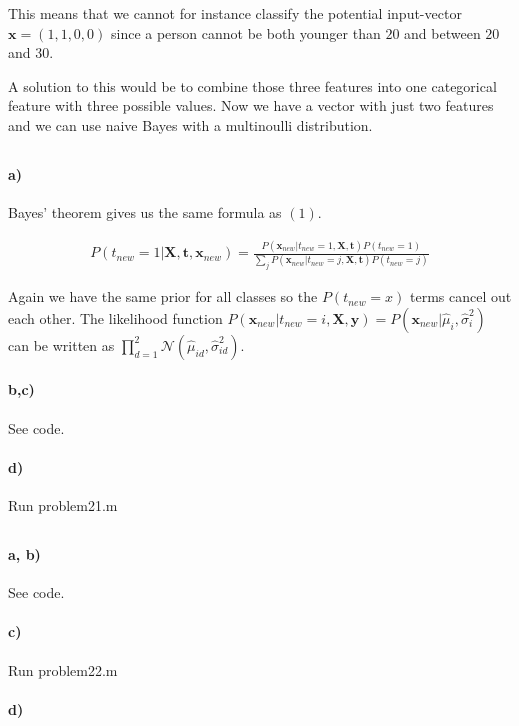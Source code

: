 \documentclass{article}
\begin{document}
This means that we cannot for instance classify the potential input-vector
$\mathbf{x} = (1, 1, 0, 0)$ since a person cannot be both younger than $20$ and
between $20$ and $30$.

A solution to this would be to combine those three features into one
categorical feature with three possible values. Now we have a vector with just
two features and we can use naive Bayes with a multinoulli distribution.

\setcounter{section}{2}
\setcounter{subsection}{0}
\subsection{}

\paragraph{a)}

Bayes' theorem gives us the same formula as $(1)$.

\begin{align}
  P\left( t_{new} = 1 \vert \mathbf{X}, \mathbf{t}, \mathbf{x}_{new} \right)
  = \frac{P \left( \mathbf{x}_{new} \vert t_{new} = 1, \mathbf{X}, \mathbf{t} \right) P \left( t_{new} = 1 \right)}{ \sum_j P \left( \mathbf{x}_{new} \vert t_{new} = j, \mathbf{X}, \mathbf{t} \right) P \left( t_{new} = j \right) }
\end{align}

Again we have the same prior for all classes so the $P(t_{new} = x)$ terms cancel out each other. The likelihood function $P(\mathbf{x}_{new}
\vert t_{new} = i, \mathbf{X}, \mathbf{y}) = P(\mathbf{x}_{new} \vert
\hat{\mu}_i, \hat{\sigma}_i^2)$ can be written as $\prod_{d = 1}^{2}
\mathcal{N}(\hat{\mu}_{id}, \hat{\sigma}^2_{id})$.

\paragraph{b,c)}

See code.

\paragraph{d)}

Run problem21.m

\subsection{}

\paragraph{a, b)}

See code.

\paragraph{c)}

Run problem22.m

\paragraph{d)}

\begin{tabular}{c | c | c)
  
\end{tabular}
\end{document}
